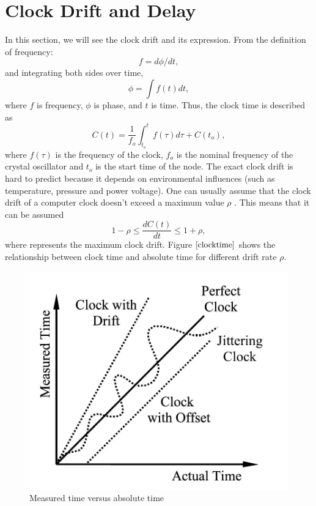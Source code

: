 \documentclass[a4paper,10pt]{report}
\begin{document}
\section{\textbf{Clock Drift and Delay}}
In this section, we will see the clock drift and its expression. From the definition of frequency:
\begin{equation}
f = d\phi/dt \label{freq_defn} ,
\end{equation}
and integrating both sides over time,
 \begin{equation}
\phi =\int f(t)dt ,
 \end{equation}
where $f$ is frequency, $\phi$ is phase, and $t$ is time.\newline
Thus, the clock time is described as
\begin{equation}
C(t) = \frac{1}{f_o}\int_{t_o}^{t} {f(\tau)d\tau} + C(t_o) ,
\label{clock}
\end{equation}
where $f(\tau)$ is the frequency of the clock, $f_o$ is the nominal frequency of the crystal oscillator and $t_o$ is the start time of
the node. The exact clock drift is hard to predict because it depends on environmental influences (such as temperature, pressure
and power voltage). One can usually assume that the clock drift of a computer clock doesn't exceed a maximum value $\rho$ . This means
that it can be assumed
\begin{equation}
1-\rho \leq \frac{dC(t)}{dt} \leq 1+\rho ,
\end{equation}
where  represents the maximum clock drift. Figure $\ref{clocktime}$ shows the relationship between clock time and absolute time for different drift rate $\rho$.
\begin{figure}
\centering
\includegraphics[width=0.6 \textwidth]{actualvsmeasuredtime}
\caption{Measured time versus absolute time} \label{clocktime}
\end{figure}
\end{document}
